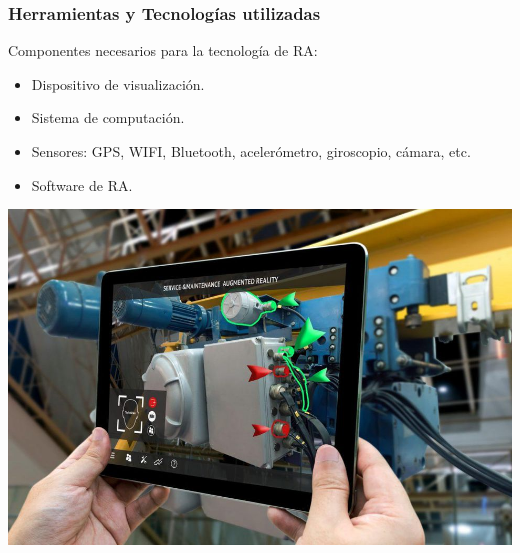\begin{frame}
	\frametitle{Herramientas y Tecnologías utilizadas}
			Componentes necesarios para la tecnología de RA:
			\begin{itemize}
				\item {Dispositivo de visualización.}
				\item {Sistema de computación.}
				\item {Sensores: GPS, WIFI, Bluetooth, acelerómetro, giroscopio, cámara, etc.}
				\item {Software de RA.}
			\end{itemize}
		\endblock{}

		\begin{center}
			\includegraphics[width=0.43\linewidth]{Images/ar1}
		\end{center}
\end{frame}
		


